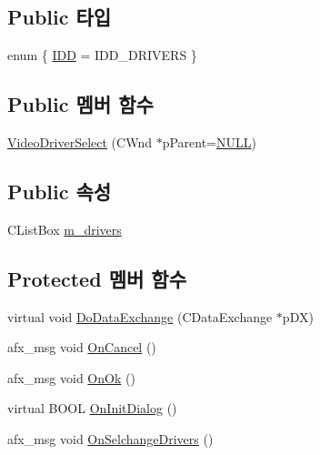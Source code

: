 \subsection*{Public 타입}
\begin{DoxyCompactItemize}
\item 
enum \{ \mbox{\hyperlink{class_video_driver_select_aca4a8f04ceb8dbf7c359c6c185573af6add6bc5e0e3b72451b510ce04d102930f}{I\+DD}} = I\+D\+D\+\_\+\+D\+R\+I\+V\+E\+RS
 \}
\end{DoxyCompactItemize}
\subsection*{Public 멤버 함수}
\begin{DoxyCompactItemize}
\item 
\mbox{\hyperlink{class_video_driver_select_aca923e596b34b0189bb365ef0850dada}{Video\+Driver\+Select}} (C\+Wnd $\ast$p\+Parent=\mbox{\hyperlink{_system_8h_a070d2ce7b6bb7e5c05602aa8c308d0c4}{N\+U\+LL}})
\end{DoxyCompactItemize}
\subsection*{Public 속성}
\begin{DoxyCompactItemize}
\item 
C\+List\+Box \mbox{\hyperlink{class_video_driver_select_a6f3953363969c0e8a4c52f6247fb41d9}{m\+\_\+drivers}}
\end{DoxyCompactItemize}
\subsection*{Protected 멤버 함수}
\begin{DoxyCompactItemize}
\item 
virtual void \mbox{\hyperlink{class_video_driver_select_a47e5d56d294f03dd184e2d4b28f38d4c}{Do\+Data\+Exchange}} (C\+Data\+Exchange $\ast$p\+DX)
\item 
afx\+\_\+msg void \mbox{\hyperlink{class_video_driver_select_a99f4c0111aa492baa088621c1e615168}{On\+Cancel}} ()
\item 
afx\+\_\+msg void \mbox{\hyperlink{class_video_driver_select_ac9cbbcd8f906e21b7f7fb5cce824b7b8}{On\+Ok}} ()
\item 
virtual B\+O\+OL \mbox{\hyperlink{class_video_driver_select_a3f6aa71282c6849f1f4841867768eaaf}{On\+Init\+Dialog}} ()
\item 
afx\+\_\+msg void \mbox{\hyperlink{class_video_driver_select_a2b1a9be6efd33676c0c6db48d24e9a55}{On\+Selchange\+Drivers}} ()
\end{DoxyCompactItemize}


